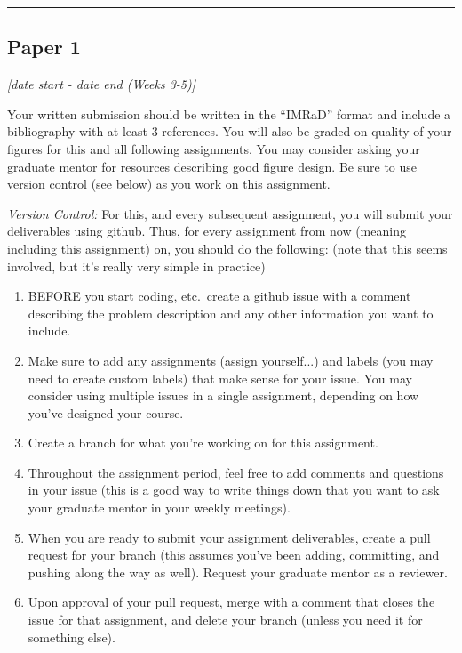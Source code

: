 \documentclass[12pt]{article}
\begin{document}
\vspace{1em}\hrule\vspace{1em}
\subsection{Paper 1}
\label{ssec:p1}
\textit{[date start - date end (Weeks 3-5)]}

\bigskip

Your written submission should be written in the ``IMRaD'' format and include a bibliography with at least 3 references. 
You will also be graded on quality of your figures for this and all following assignments.
You may consider asking your graduate mentor for resources describing good figure design.
Be sure to use version control (see below) as you work on this assignment.

\bigskip

\noindent \textit{Version Control:}
For this, and every subsequent assignment, you will submit your deliverables using github.  Thus, for every assignment from now (meaning including this assignment) on, you should do the following: (note that this seems involved, but it's really very simple in practice)

\begin{enumerate}
	\item BEFORE you start coding, etc.~create a github issue with a comment describing the problem description and any other information you want to include.
	\item Make sure to add any assignments (assign yourself...) and labels (you may need to create custom labels) that make sense for your issue. You may consider using multiple issues in a single assignment, depending on how you've designed your course.
	\item Create a branch for what you're working on for this assignment.
	\item Throughout the assignment period, feel free to add comments and questions in your issue (this is a good way to write things down that you want to ask your graduate mentor in your weekly meetings).
	\item When you are ready to submit your assignment deliverables, create a pull request for your branch (this assumes you've been adding, committing, and pushing along the way as well). Request your graduate mentor as a reviewer.
	\item Upon approval of your pull request, merge with a comment that closes the issue for that assignment, and delete your branch (unless you need it for something else).
\end{enumerate}
\end{document}

